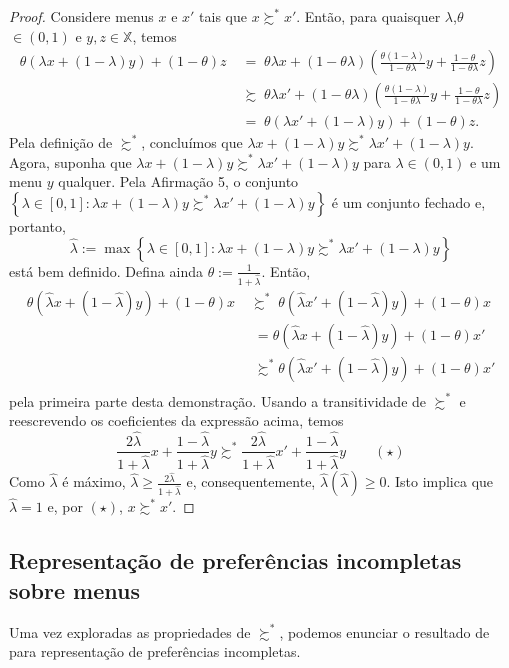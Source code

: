 \documentclass[11pt, a4paper]{article}
\theoremstyle{nonumberplain}
\newtheorem{proof}{Dem.}
\theoremstyle{plain}
\theoremstyle{plain}
\theoremstyle{plain}
\begin{document}
\begin{proof}
Considere menus $x$ e $x'$ tais que $x\succsim^* x'$. Então, para quaisquer $\lambda$,$\theta$ $\in (0,1)$ e $y,z\in\mathbb{X}$, temos
\begin{align*}
\theta(\lambda x + (1-\lambda)y)+(1-\theta)z \;&=\; \theta\lambda x + (1-\theta\lambda)\left(\frac{\theta(1-\lambda)}{1-\theta\lambda}y+\frac{1-\theta}{1-\theta\lambda}z\right)\\
&\succsim\;  \theta\lambda x' + (1-\theta\lambda)\left(\frac{\theta(1-\lambda)}{1-\theta\lambda}y+\frac{1-\theta}{1-\theta\lambda}z\right)\\
&=\; \theta(\lambda x' + (1-\lambda)y)+(1-\theta)z.
\end{align*}
Pela definição de $\succsim^*$, concluímos que $\lambda x + (1-\lambda)y\succsim^*\lambda x' + (1-\lambda)y$. 
Agora, suponha que $\lambda x + (1-\lambda)y\succsim^*\lambda x' + (1-\lambda)y$ para $\lambda\in(0,1)$ e um menu $y$ qualquer. Pela Afirmação 5, o conjunto $\left\{\lambda\in[0,1]:\lambda x + (1-\lambda)y\succsim^*\lambda x' + (1-\lambda)y\right\}$ é um conjunto fechado e, portanto, $$\hat{\lambda}:=\max\left\{\lambda\in[0,1]:\lambda x + (1-\lambda)y\succsim^*\lambda x' + (1-\lambda)y\right\}$$ está bem definido. Defina ainda $\theta:=\frac{1}{1+\hat{\lambda}}$. Então,
\begin{align*}
\theta(\hat{\lambda}x+(1-\hat{\lambda})y)+(1-\theta)x\;&\succsim^*\;\theta(\hat{\lambda}x'+(1-\hat{\lambda})y)+(1-\theta)x\\
&\;= \theta(\hat{\lambda}x+(1-\hat{\lambda})y)+(1-\theta)x'\\
&\;\succsim^* \theta(\hat{\lambda}x'+(1-\hat{\lambda})y)+(1-\theta)x'\\  
\end{align*} pela primeira parte desta demonstração. Usando a transitividade de $\succsim^*$ e reescrevendo os coeficientes da expressão acima, temos $$\frac{2\hat{\lambda}}{1+\hat{\lambda}}x+\frac{1-\hat{\lambda}}{1+\hat{\lambda}}y \succsim^* \frac{2\hat{\lambda}}{1+\hat{\lambda}}x'+\frac{1-\hat{\lambda}}{1+\hat{\lambda}}y \qquad (\star)$$ Como $\hat{\lambda}$ é máximo, $\hat{\lambda}\geq \frac{2\hat{\lambda}}{1+\hat{\lambda}}$ e, consequentemente, $\hat{\lambda}(\hat{\lambda})\geq 0$. Isto implica que $\hat{\lambda}=1$ e, por $(\star)$, $x\succsim^* x'$.
\end{proof}

\subsection{Representação de preferências incompletas sobre menus}
Uma vez exploradas as propriedades de $\succsim^*$, podemos enunciar o resultado de \cite{Kochov2007} para representação de preferências incompletas.
\end{document}
